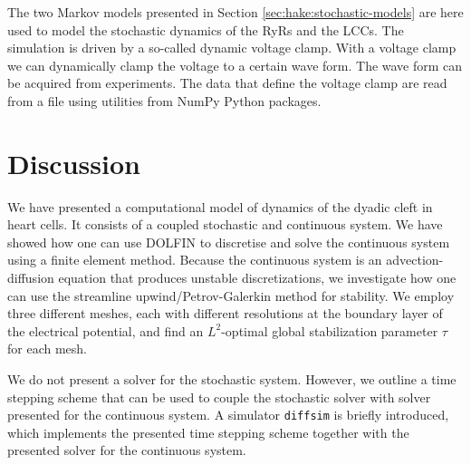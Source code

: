 The two Markov models presented in Section
\ref{sec:hake:stochastic-models} are here used to model the stochastic
dynamics of the RyRs and the LCCs. The simulation is driven by a
so-called dynamic voltage clamp. With a voltage clamp we can
dynamically clamp the voltage to a certain wave form. The wave form
can be acquired from experiments. The data that define the voltage
clamp are read from a file using utilities from NumPy Python packages.

\section{Discussion}

We have presented a computational model of \Ca dynamics of the dyadic
cleft in heart cells. It consists of a coupled stochastic and
continuous system. We have showed how one can use DOLFIN to discretise
and solve the continuous system using a finite element method. Because
the continuous system is an advection-diffusion equation that produces
unstable discretizations, we investigate how one can use the
streamline upwind/Petrov-Galerkin method for stability. We employ
three different meshes, each with different resolutions at the
boundary layer of the electrical potential, and find an $L^2$-optimal
global stabilization parameter $\tau$ for each mesh.

We do not present a solver for the stochastic system. However, we
outline a time stepping scheme that can be used to couple the
stochastic solver with solver presented for the continuous system. A
simulator \texttt{diffsim} is briefly introduced, which implements the
presented time stepping scheme together with the presented solver for
the continuous system.
